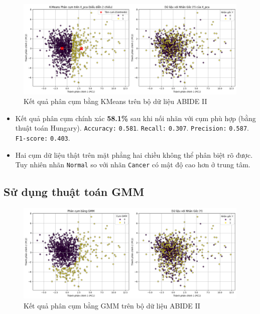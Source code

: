 \begin{figure}[H]
    \centering
    \includegraphics[width=1\linewidth]{img/abideii_plot.png}
    \caption{Kết quả phân cụm bằng KMeans trên bộ dữ liệu ABIDE II}
    \label{fig:abideii_plot}
\end{figure}

\begin{itemize}
    \item Kết quả phân cụm chính xác \textbf{58.1\%} sau khi nối nhãn với cụm phù hợp (bằng thuật toán Hungary). \texttt{Accuracy:} \texttt{0.581}. \texttt{Recall:} \texttt{0.307}. \texttt{Precision:} \texttt{0.587}.  \texttt{F1-score:} \texttt{0.403}. 
    \item Hai cụm dữ liệu thật trên mặt phẳng hai chiều không thể phân biệt rõ được. Tuy nhiên nhãn \texttt{Normal} so với nhãn \texttt{Cancer} có mật độ cao hơn ở trung tâm.
\end{itemize}

\subsection{Sử dụng thuật toán GMM}

\begin{figure}[H]
    \centering
    \includegraphics[width=1\linewidth]{img/abideii_plot_gmm.png}
    \caption{Kết quả phân cụm bằng GMM trên bộ dữ liệu ABIDE II}
    \label{fig:abideii_plot_gmm}
\end{figure}

